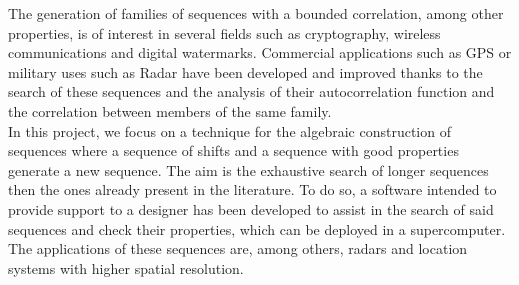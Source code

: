 The generation of families of sequences with a bounded correlation, among other
properties, is of interest in several fields such as cryptography,
wireless communications and digital watermarks. Commercial applications such as
GPS or military uses such as Radar have been developed and improved thanks to
the search of these sequences and the analysis of their autocorrelation function
and the correlation between members of the same family.\\

In this project, we focus on a technique for the algebraic construction of
sequences where a sequence of shifts and a sequence with good
properties generate a new sequence. The aim is the exhaustive
search of longer sequences then the ones already present in the literature.
To do so, a software intended to provide support to a designer  has been developed to assist in the search of said
sequences and check their properties, which can be deployed in a supercomputer. The applications of these sequences
are, among others, radars and location systems with higher spatial resolution.
